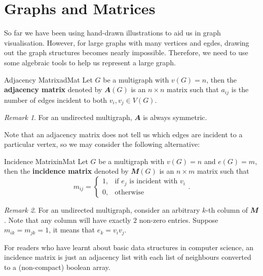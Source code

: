 \documentclass[math, code]{amznotes}
\theoremstyle{remark}
\newtheorem*{remark}{Remark}
\begin{document}
\section{Graphs and Matrices}
So far we have been using hand-drawn illustrations to aid us in graph visualisation. However, for large graphs with many vertices and egdes, drawing out the graph structures becomes nearly impossible. Therefore, we need to use some algebraic tools to help us represent a large graph.
\begin{dfnbox}{Adjacency Matrix}{adMat}
    Let $G$ be a multigraph with $v(G) = n$, then the {\color{red} \textbf{adjacency matrix}} denoted by $\mathbfit{A}(G)$ is an $n \times n$ matrix such that $a_{ij}$ is the number of edges incident to both $v_i, v_j \in V(G)$.
\end{dfnbox}
\begin{notebox}
    \begin{remark}
        For an undirected multigraph, $\mathbfit{A}$ is always symmetric.
    \end{remark}
\end{notebox}
Note that an adjacency matrix does not tell us which edges are incident to a particular vertex, so we may consider the following alternative:
\begin{dfnbox}{Incidence Matrix}{inMat}
    Let $G$ be a multigraph with $v(G) = n$ and $e(G) = m$, then the {\color{red} \textbf{incidence matrix}} denoted by $\mathbfit{M}(G)$ is an $n \times m$ matrix such that
    \begin{equation*}
        m_{ij} = \begin{cases}
            1, &\textrm{if } e_j \textrm{ is incident with } v_i \\
            0, &\textrm{otherwise}
        \end{cases}.
    \end{equation*}
\end{dfnbox}
\begin{notebox}
    \begin{remark}
        For an undirected multigraph, consider an arbitrary $k$-th column of $\mathbfit{M}$. Note that any column will have exactly $2$ non-zero entries. Suppose $m_{ik} = m_{jk} = 1$, it means that $e_k = v_iv_j$.
    \end{remark}
\end{notebox}
For readers who have learnt about basic data structures in computer science, an incidence matrix is just an adjacency list with each list of neighbours converted to a (non-compact) boolean array.
\end{document}
